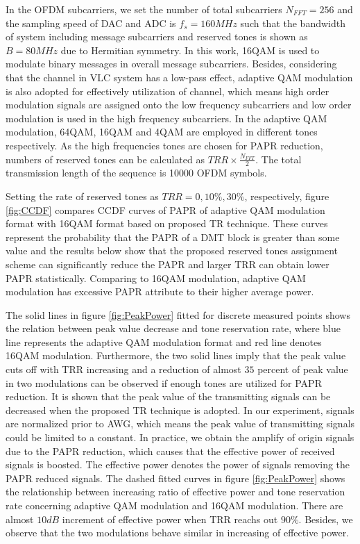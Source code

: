 \documentclass[9pt,twocolumn,twoside]{osajnl}
\begin{document}
In the OFDM subcarriers, we set the number of total subcarriers $N_{FFT}=256$ and the sampling speed of DAC and ADC is $f_s=160MHz$ such that the bandwidth of system including message subcarriers and reserved tones 
is shown as $B=80MHz$ due to Hermitian symmetry. In this work, 16QAM is used to modulate binary messages in overall message subcarriers. Besides, considering that the channel in VLC system has a low-pass effect, adaptive QAM 
modulation is also adopted for effectively utilization of channel, which means high order modulation signals are assigned onto the low frequency subcarriers and low order modulation is used in the high frequency subcarriers. 
In the adaptive QAM modulation, 64QAM, 16QAM and 4QAM are employed in different tones respectively. As the high frequencies tones are chosen for PAPR reduction, numbers of reserved tones can be calculated as 
$TRR \times \frac{N_{FFT}}{2}$. The total transmission length of the sequence is 10000 OFDM symbols. 

Setting the rate of reserved tones as $TRR=0, 10\%, 30\%$, respectively, figure \ref{fig:CCDF} compares CCDF curves of PAPR of adaptive QAM modulation format with 16QAM format based on proposed TR 
technique. These curves represent the probability that the PAPR of a DMT block is greater than some value and the results below show that the proposed reserved tones assignment scheme can significantly reduce the PAPR and 
larger TRR can obtain lower PAPR statistically. Comparing to 16QAM modulation, adaptive QAM modulation has excessive PAPR attribute to their higher average power.

The solid lines in figure \ref{fig:PeakPower} fitted for discrete measured points shows the relation between peak value decrease and tone reservation rate, where blue line represents the adaptive QAM modulation format and red 
line denotes 16QAM modulation. Furthermore, the two solid lines imply that the peak value cuts off with TRR increasing and a reduction of almost $35$ percent of peak value in two modulations can be observed if 
enough tones are utilized for PAPR reduction. It is shown that the peak value of the transmitting signals can be decreased when the proposed TR technique is adopted. In our experiment, signals are normalized prior to AWG, which means the peak 
value of transmitting signals could be limited to a constant. In practice, we obtain the amplify of origin signals due to the PAPR reduction, which causes that the effective power of received signals is boosted. The effective 
power denotes the power of signals removing the PAPR reduced signals. The dashed fitted curves in figure \ref{fig:PeakPower} shows the relationship between increasing ratio of effective power and tone reservation rate concerning adaptive QAM 
modulation and 16QAM modulation. There are almost $10dB$ increment of effective power when TRR reachs out $90\%$. Besides, we observe that the two modulations behave similar in increasing of effective power.
\end{document}
